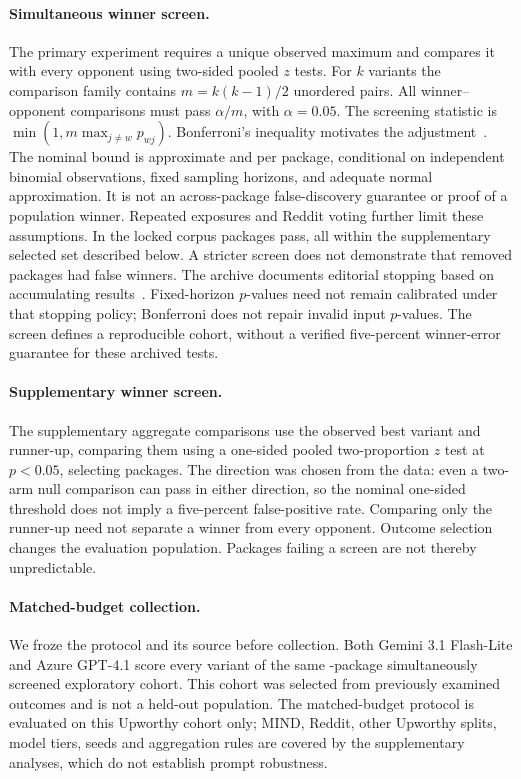 \paragraph{Simultaneous winner screen.}
The primary experiment requires a unique observed maximum and compares it with every opponent using
two-sided pooled $z$ tests. For $k$ variants the comparison family contains $m=k(k-1)/2$ unordered
pairs. All winner--opponent comparisons must pass $\alpha/m$, with $\alpha=0.05$.
The screening statistic is $\min(1,m\max_{j\ne w}p_{wj})$. Bonferroni's inequality motivates the
adjustment~\citep{nistBonferroni}. The nominal bound is approximate and per package, conditional on
independent binomial observations, fixed sampling horizons, and adequate normal approximation. It is not an across-package
false-discovery guarantee or proof of a population winner. Repeated exposures and Reddit voting
further limit these assumptions. In the locked corpus \newSelectedN{} packages pass, all within
the supplementary selected set described below. A stricter screen does not demonstrate that removed packages had
false winners. The archive documents editorial stopping based on accumulating results~\citep{matiasUpworthy}.
Fixed-horizon $p$-values need not remain calibrated under that stopping policy; Bonferroni does
not repair invalid input $p$-values. The screen defines a reproducible cohort, without a verified
five-percent winner-error guarantee for these archived tests.

\paragraph{Supplementary winner screen.}
The supplementary aggregate comparisons use the observed best variant and runner-up,
comparing them using a one-sided pooled two-proportion $z$ test at $p<0.05$, selecting \legacySelectedN{} packages.
The direction was chosen from the data: even a two-arm null comparison can pass in either
direction, so the nominal one-sided threshold does not imply a five-percent false-positive rate.
Comparing only the runner-up need not separate a winner from every opponent. Outcome selection
changes the evaluation population. Packages failing a screen are not thereby unpredictable.

\paragraph{Matched-budget collection.}
We froze the protocol and its source before collection. Both Gemini 3.1 Flash-Lite and Azure GPT-4.1 score
every variant of the same \newSelectedN{}-package simultaneously screened exploratory cohort. This cohort
was selected from previously examined outcomes and is not a held-out population. The
matched-budget protocol is evaluated on this Upworthy cohort only; MIND, Reddit, other Upworthy
splits, model tiers, seeds and aggregation rules are covered by the supplementary analyses,
which do not establish prompt robustness.

